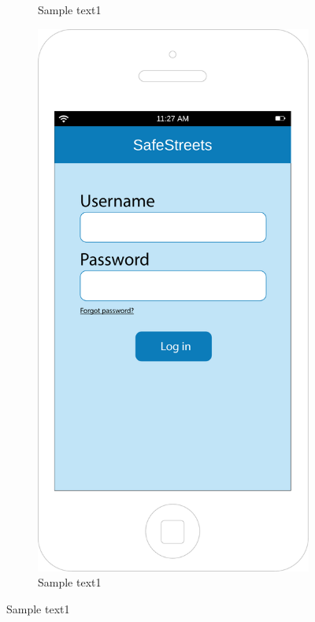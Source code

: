 \documentclass[12pt,a4paper]{report}
\begin{document}
\begin{figure}[h]
\begin{subfigure}{0.5\textwidth}
			\caption{Sample text1}
			\label{fig:subim1}
		\end{subfigure}
		\begin{subfigure}{0.5\textwidth}
			\includegraphics[scale=0.25, center]{Login}
			\caption{Sample text1}
			\label{fig:subim1}
		\end{subfigure}
		\end{figure}
\end{document}

